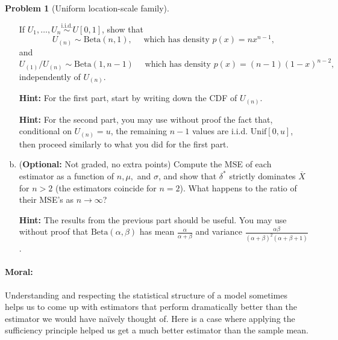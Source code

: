 \documentclass{article}
\newcommand{\simiid}{\overset{\text{i.i.d.}}{\sim}}
\theoremstyle{definition}
\newtheorem{problem}{Problem}
\begin{document}
\begin{problem}[Uniform location-scale family]
\begin{enumerate}[(a)]
If $U_1,\ldots,U_n \simiid U[0,1]$, show that
\[
U_{(n)} \sim \text{Beta}(n,1), \quad\text{ which has density } p(x) = n x^{n-1},
\]
and
\[
U_{(1)}/U_{(n)} \sim \text{Beta}(1,n-1) \quad\text{ which has density } p(x) = (n-1)(1-x)^{n-2},
\]
independently of $U_{(n)}$.

{\bf Hint:} For the first part, start by writing down the CDF of $U_{(n)}$.

{\bf Hint:} For the second part, you may use without proof the fact that, conditional on $U_{(n)} = u$, the remaining $n-1$ values are i.i.d. $\text{Unif}[0,u]$, then proceed similarly to what you did for the first part.





\item ({\bf Optional:} Not graded, no extra points) Compute the MSE of each estimator as a function of $n, \mu,$ and $\sigma$, and show that $\delta^*$ strictly dominates $\overline{X}$ for $n > 2$ (the estimators coincide for $n=2$). What happens to the ratio of their MSE's as $n\to\infty$?

{\bf Hint:} The results from the previous part should be useful. You may use without proof that $\text{Beta}(\alpha,\beta)$ has mean $\frac{\alpha}{\alpha+\beta}$ and variance $\frac{\alpha\beta}{(\alpha+\beta)^2(\alpha + \beta + 1)}$.





\end{enumerate}

\paragraph{Moral:} Understanding and respecting the statistical structure of a model sometimes helps us to come up with estimators that perform dramatically better than the estimator we would have na\"{i}vely thought of. Here is a case where applying the sufficiency principle helped us get a much better estimator than the sample mean.

\end{problem}
\end{document}
